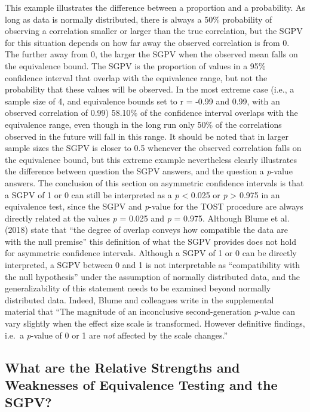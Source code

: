 \documentclass[,man,floatsintext]{apa6}
\begin{document}
This example illustrates the difference between a proportion and a
probability. As long as data is normally distributed, there is always a
50\% probability of observing a correlation smaller or larger than the
true correlation, but the SGPV for this situation depends on how far
away the observed correlation is from 0. The further away from 0, the
larger the SGPV when the observed mean falls on the equivalence bound.
The SGPV is the proportion of values in a 95\% confidence interval that
overlap with the equivalence range, but not the probability that these
values will be observed. In the most extreme case (i.e., a sample size
of 4, and equivalence bounds set to r = -0.99 and 0.99, with an observed
correlation of 0.99) 58.10\% of the confidence interval overlaps with
the equivalence range, even though in the long run only 50\% of the
correlations observed in the future will fall in this range. It should
be noted that in larger sample sizes the SGPV is closer to 0.5 whenever
the observed correlation falls on the equivalence bound, but this
extreme example nevertheless clearly illustrates the difference between
question the SGPV answers, and the question a \emph{p}-value answers.
The conclusion of this section on asymmetric confidence intervals is
that a SGPV of 1 or 0 can still be interpreted as a \emph{p} \textless{}
0.025 or \emph{p} \textgreater{} 0.975 in an equivalence test, since the
SGPV and \emph{p}-value for the TOST procedure are always directly
related at the values \emph{p} = 0.025 and \emph{p} = 0.975. Although
Blume et al. (2018) state that \enquote{the degree of overlap conveys
how compatible the data are with the null premise} this definition of
what the SGPV provides does not hold for asymmetric confidence
intervals. Although a SGPV of 1 or 0 can be directly interpreted, a SGPV
between 0 and 1 is not interpretable as \enquote{compatibility with the
null hypothesis} under the assumption of normally distributed data, and
the generalizability of this statement needs to be examined beyond
normally distributed data. Indeed, Blume and colleagues write in the
supplemental material that \enquote{The magnitude of an inconclusive
second-generation \emph{p}-value can vary slightly when the effect size
scale is transformed. However definitive findings, i.e.~a \emph{p}-value
of 0 or 1 are \emph{not} affected by the scale changes.}

\subsection{What are the Relative Strengths and Weaknesses of
Equivalence Testing and the
SGPV?}\label{what-are-the-relative-strengths-and-weaknesses-of-equivalence-testing-and-the-sgpv}
\end{document}
